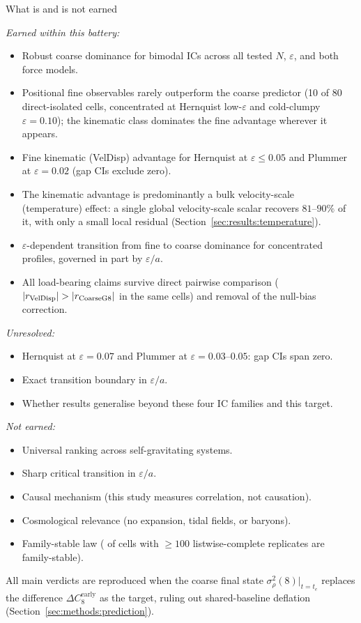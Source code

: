 \documentclass[twocolumn,linenumbers]{aastex701}
\makeatletter
\def\subsection{\@startsection{subsection}{2}{\z@}{9pt plus 1pt minus 1pt}{4pt}%
  {\normalsize\bfseries\center}}
\newcommand{\dCearly}{\Delta C_{8}^{\mathrm{early}}}
\newcommand{\sigrho}{\sigma^{2}_{\rho}}
\newcommand{\heps}{\varepsilon}
\makeatother
\begin{document}
\subsection{What is and is not earned}
\label{sec:discussion:scope}

\textit{Earned within this battery:}
\begin{itemize}
  \item Robust coarse dominance for bimodal ICs across all tested
    $N$, $\heps$, and both force models.
  \item Positional fine observables rarely outperform the coarse predictor
    (10 of 80 direct-isolated cells, concentrated at Hernquist low-$\heps$
    and cold-clumpy $\heps = 0.10$); the kinematic class dominates the
    fine advantage wherever it appears.
  \item Fine kinematic (VelDisp) advantage for Hernquist at
    $\heps \le 0.05$ and Plummer at $\heps = 0.02$ (gap CIs exclude zero).
  \item The kinematic advantage is predominantly a bulk velocity-scale
    (temperature) effect: a single global velocity-scale scalar recovers
    $81$--$90\%$ of it, with only a small local residual
    (Section~\ref{sec:results:temperature}).
  \item $\heps$-dependent transition from fine to coarse dominance for
    concentrated profiles, governed in part by $\heps/a$.
  \item All load-bearing claims survive direct pairwise comparison
    ($|r_{\rm VelDisp}| > |r_{\rm CoarseG8}|$ in the same cells)
    and removal of the null-bias correction.
\end{itemize}

\textit{Unresolved:}
\begin{itemize}
  \item Hernquist at $\heps = 0.07$ and Plummer at
    $\heps = 0.03$--$0.05$: gap CIs span zero.
  \item Exact transition boundary in $\heps/a$.
  \item Whether results generalise beyond these four IC families
    and this target.
\end{itemize}

\textit{Not earned:}
\begin{itemize}
  \item Universal ranking across self-gravitating systems.
  \item Sharp critical transition in $\heps/a$.
  \item Causal mechanism (this study measures correlation, not causation).
  \item Cosmological relevance (no expansion, tidal fields, or baryons).
  \item Family-stable law (\NFamilyStableCells{} of \NCells{} cells
    with $\ge 100$ listwise-complete replicates are family-stable).
\end{itemize}
All main verdicts are reproduced when the coarse final state
$\sigrho(8)|_{t=t_e}$ replaces the difference $\dCearly$ as the
target, ruling out shared-baseline deflation
(Section~\ref{sec:methods:prediction}).
\end{document}
